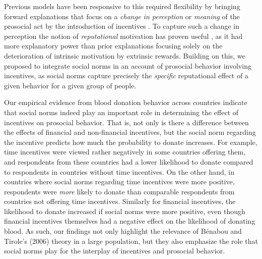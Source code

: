 \documentclass[AER]{AEA}
\begin{document}
Previous models have been responsive to this required flexibility by bringing forward explanations that focus on a \textit{change in perception} or \textit{meaning} of the prosocial act by the introduction of incentives \cite[e.g., ][]{heyman_effort_2004, gneezy_pay_2000, benabou_incentives_2006}. To capture such a change in perception the notion of \textit{reputational} motivation has proven useful \citep{benabou_incentives_2006, ariely_doing_2009}, as it had more explanatory power than prior explanations focusing solely on the deterioration of intrinsic motivation by extrinsic rewards. Building on this, we proposed to integrate social norms in an account of prosocial behavior involving incentives, as social norms capture precisely the \textit{specific} reputational effect of a given behavior for a given group of people.

Our empirical evidence from blood donation behavior across countries indicate that social norms indeed play an important role in determining the effect of incentives on prosocial behavior. That is, not only is there a difference between the effects of financial and non-financial incentives, but the social norm regarding the incentive predicts how much the probability to donate increases. For example, time incentives were viewed rather negatively in some countries offering them, and respondents from these countries had a lower likelihood to donate compared to respondents in countries without time incentives. On the other hand, in countries where social norms regarding time incentives were more positive, respondents were \textit{more} likely to donate than comparable respondents from countries not offering time incentives. Similarly for financial incentives, the likelihood to donate increased if social norms were more positive, even though financial incentives themselves had a negative effect on the likelihood of donating blood. As such, our findings not only highlight the relevance of Bénabou and Tirole’s (2006) theory in a large population, but they also emphasize the role that social norms play for the interplay of incentives and prosocial behavior.
\end{document}
